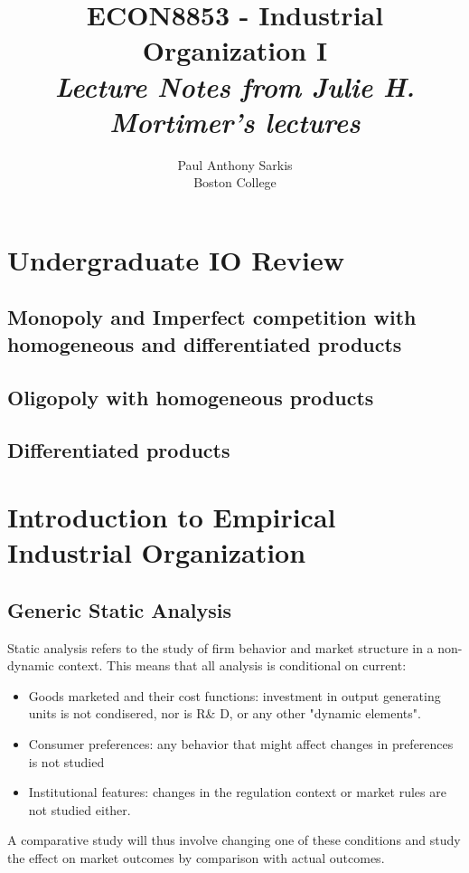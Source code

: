 \documentclass[12pt]{report}
\begin{document}
\date{}
\title{\textbf{\huge{ECON8853 - Industrial Organization I}}\\ \textit{Lecture Notes from Julie H. Mortimer's lectures}}
\author{Paul Anthony Sarkis\\ Boston College} 
 
\maketitle

\tableofcontents

\chapter*{Undergraduate IO Review}

\section{Monopoly and Imperfect competition with homogeneous and differentiated products}



\section{Oligopoly with homogeneous products}



\section{Differentiated products}



\chapter{Introduction to Empirical Industrial Organization}



\section{Generic Static Analysis}

Static analysis refers to the study of firm behavior and market structure in a non-dynamic context. This means that all analysis is conditional on current:\begin{itemize}
\item Goods marketed and their cost functions: investment in output generating units is not condisered, nor is R\& D, or any other "dynamic elements".
\item Consumer preferences: any behavior that might affect changes in preferences is not studied
\item Institutional features: changes in the regulation context or market rules are not studied either.
\end{itemize} A comparative study will thus involve changing one of these conditions and study the effect on market outcomes by comparison with actual outcomes.
\end{document}
